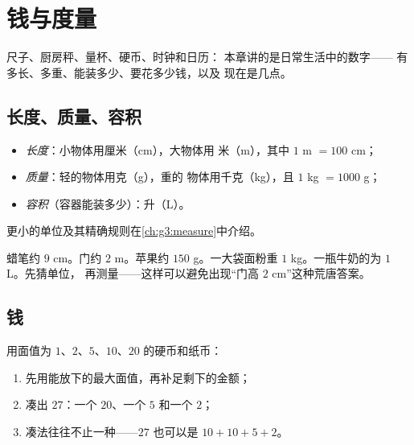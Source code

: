 \chapter{钱与度量}\label{ch:g2:measure}

尺子、厨房秤、量杯、硬币、时钟和日历：
本章讲的是日常生活中的数字——
有多长、多重、能装多少、要花多少钱，以及
现在是几点。

\section{长度、质量、容积}

\begin{definition}[日常单位]\label{def:g2:measure:units}
\begin{itemize}
  \item \emph{长度}：小物体用厘米（cm），大物体用
        米（m），其中 $1$ m $= 100$ cm；
  \item \emph{质量}：轻的物体用克（g），重的
        物体用千克（kg），且 $1$ kg $= 1000$ g；
  \item \emph{容积}（容器能装多少）：升（L）。
\end{itemize}
更小的单位及其精确规则在\cref{ch:g3:measure}中介绍。
\end{definition}

\begin{example}[用哪个单位？]\label{ex:g2:measure:choose}
蜡笔约 $9$ cm。门约 $2$ m。苹果约 $150$
g。一大袋面粉重 $1$ kg。一瓶牛奶的为 $1$ L。先猜单位，
再测量——这样可以避免出现“门高 $2$
cm”这种荒唐答案。
\end{example}

\section{钱}

\begin{method}[凑出金额]\label{met:g2:measure:money}
用面值为 $1$、$2$、$5$、$10$、$20$ 的硬币和纸币：
\begin{enumerate}
  \item 先用能放下的最大面值，再补足剩下的金额；
  \item 凑出 $27$：一个 $20$、一个 $5$ 和一个 $2$；
  \item 凑法往往不止一种——$27$ 也可以是 $10 + 10 + 5 +
        2$。
\end{enumerate}
\end{method}

